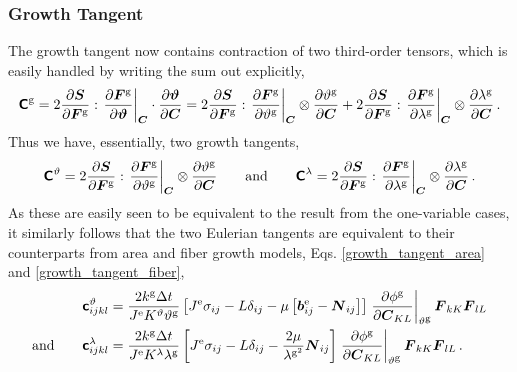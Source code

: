 \documentclass[10pt,letterpaper,oneside]{report}
\newcommand{\ten}[1]{\mbox{\boldmath $#1$}{}}
\newcommand{\tenf}[1]{\mbox{{\sffamily{\bfseries {#1}}}}}
\newcommand{\scas}[1]{\mbox{{\scriptsize{${\rm{#1}}$}}}{}}
\newcommand{\tens}[1]{\mbox{\boldmath{\scriptsize{$#1$}}}{}}
\begin{document}
\begin{itemize}
\subsubsection{Growth Tangent}
The growth tangent now contains contraction of two third-order tensors, which is easily handled by writing the sum out explicitly, 
\begin{equation}
\tenf{C}^{\scas{g}} = 2 \frac{\partial \ten{S} }{\partial \ten{F}^{\scas{g}} } : \left. \frac{\partial \ten{F}^{\scas{g}} }{\partial \ten{\vartheta} } \right|_{\tens{C}} \cdot \frac{\partial \ten{\vartheta} }{\partial \ten{C}} = 2 \frac{\partial \ten{S} }{\partial \ten{F}^{\scas{g}} } : \left. \frac{\partial \ten{F}^{\scas{g}} }{\partial \vartheta^{\scas{g}} } \right|_{\tens{C}} \otimes \frac{\partial  \vartheta^{\scas{g}} }{\partial \ten{C}} + 2 \frac{\partial \ten{S} }{\partial \ten{F}^{\scas{g}} } : \left. \frac{\partial \ten{F}^{\scas{g}} }{\partial \lambda^{\scas{g}} } \right|_{\tens{C}} \otimes \frac{\partial \lambda^{\scas{g}} }{\partial \ten{C}} \, . 
\end{equation}
Thus we have, essentially, two growth tangents,
\begin{equation}
\tenf{C}^\vartheta = 2 \frac{\partial \ten{S} }{\partial \ten{F}^{\scas{g}} } : \left. \frac{\partial \ten{F}^{\scas{g}} }{\partial \vartheta^{\scas{g}} } \right|_{\tens{C}} \otimes \frac{\partial  \vartheta^{\scas{g}} }{\partial \ten{C}}  
\qquad \mbox{and} \qquad 
\tenf{C}^\lambda = 2 \frac{\partial \ten{S} }{\partial \ten{F}^{\scas{g}} } : \left. \frac{\partial \ten{F}^{\scas{g}} }{\partial \lambda^{\scas{g}} } \right|_{\tens{C}} \otimes \frac{\partial \lambda^{\scas{g}} }{\partial \ten{C}} \, . 
\end{equation}
As these are easily seen to be equivalent to the result from the one-variable cases, it similarly follows that the two Eulerian tangents are equivalent to their counterparts from area and fiber growth models, Eqs. \ref{growth_tangent_area} and \ref{growth_tangent_fiber}, 
\begin{align}
\tenf{c}^{\vartheta}_{ijkl} ={}& \frac{2 k^{\scas{g}} \Delta t}{J^{\scas{e}} K^\vartheta \vartheta^{\scas{g}} } \left[ J^{\scas{e}} \sigma_{ij} - L \delta_{ij} 
- \mu \left[ \ten{b}^{\scas{e}}_{ij} - \ten{N}_{ij} \right] \right] \left. \frac{\partial \phi^{\scas{g}} }{\partial \ten{C}_{KL}} \right|_{\vartheta^{\scas{g}}} \ten{F}_{kK} \ten{F}_{lL} 
\\ \mbox{and} \qquad
\tenf{c}^\lambda_{ijkl} ={}& \frac{2 k^{\scas{g}} \Delta t}{J^{\scas{e}} K^\lambda \lambda^{\scas{g}}} \left[ J^{\scas{e}} \sigma_{ij} - L \delta_{ij}  
- \frac{2 \mu }{\lambda^{\scas{g}^2}} \ten{N}_{ij} \right] \left. \frac{\partial \phi^{\scas{g}} }{\partial \ten{C}_{KL}} \right|_{\vartheta^{\scas{g}}} \ten{F}_{kK} \ten{F}_{lL} \, . 
\end{align}




\end{itemize}
\end{document}
